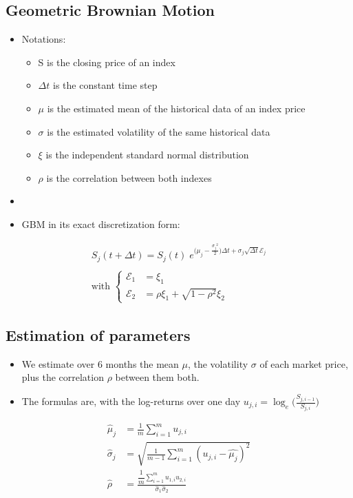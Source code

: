 \subsection{Geometric Brownian Motion}
\begin{frame}
\myframetitle{}
\begin{itemize}
  \item Notations:
	\begin{itemize}
		\item S is the closing price of an index%
		\item $\Delta t$ is the constant time step%
		\item $\mu$ is the estimated mean of the historical data of an index price
		\item $\sigma$ is the estimated volatility of the same historical data
		\item $\xi$ is the independent standard normal distribution
		\item $\rho$ is the correlation between both indexes
	\end{itemize}
	\item []
	\item GBM in its exact discretization form:
\end{itemize}
\begin{gather*}
	S_j(t+\Delta t) = S_j(t) \;
		e^{\bigl(\mu_j-\frac{{\sigma_j}^2}{2}\bigr)\Delta t+\sigma_j \sqrt{\Delta t}\mathcal{E}_j} 
	\\
	\\
	\mbox{with }
	\left \{
	\begin{array}{ll}
    \mathcal{E}_1 & = \xi_1 \\
    \mathcal{E}_2 & = \rho\xi_1 + \sqrt{1-\rho^2}\xi_2
  \end{array}
	\right.
\end{gather*}
\end{frame}

\subsection{Estimation of parameters}
\begin{frame}
\myframetitle{}
\begin{itemize}
	\item We estimate over 6 months the mean $\mu$, the volatility $\sigma$ of each market price, plus the correlation $\rho$ between them both.
	\item The formulas are, with the log-returns over one day $u_{j,i} = \log_e\bigl(\frac{S_{j,i-1}}{S_{j,i}}\bigr)$
\end{itemize}
\begin{align*}
	\hat{\mu}_j    &= \frac{1}{m} \sum_{i=1}^m u_{j,i} \\
	\hat{\sigma}_j &= \sqrt{\frac{1}{m-1} \sum_{i=1}^m (u_{j,i}-\hat{\mu_j})^2} \\
	\hat{\rho}   \;&= \frac{\dfrac{1}{m}\sum_{i=1}^m u_{1,i}u_{2,i}}{\hat{\sigma}_1 \hat{\sigma}_2}
\end{align*}
\end{frame}
